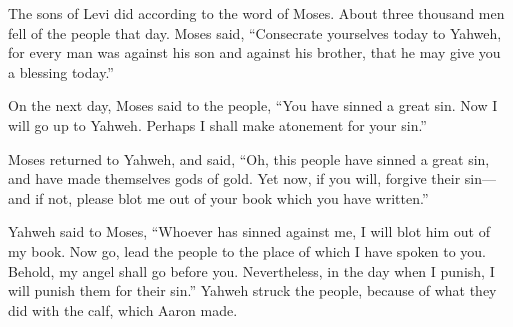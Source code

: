 {The sons of Levi did according to the word of Moses. About three thousand men fell of the people that day.
Moses said, “Consecrate yourselves today to Yahweh, for every man was against his son and against his brother, that he may give you a blessing today.”
\par }{\PP {}On the next day, Moses said to the people, “You have sinned a great sin. Now I will go up to Yahweh. Perhaps I shall make atonement for your sin.”
\par }{\PP {}Moses returned to Yahweh, and said, “Oh, this people have sinned a great sin, and have made themselves gods of gold.
Yet now, if you will, forgive their sin—and if not, please blot me out of your book which you have written.”
\par }{\PP {}Yahweh said to Moses, “Whoever has sinned against me, I will blot him out of my book.
Now go, lead the people to the place of which I have spoken to you. Behold, my angel shall go before you. Nevertheless, in the day when I punish, I will punish them for their sin.”
Yahweh struck the people, because of what they did with the calf, which Aaron made.

}
